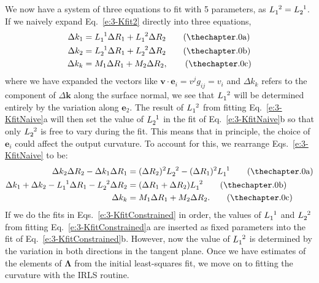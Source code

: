 We now have a system of three equations to fit with 5 parameters, as $\tensor{L}{_1^2} = \tensor{L}{_2^1}$.
If we naively expand Eq.~\ref{e:3-Kfit2} directly into three equations,
\label{e:3-KfitNaive}
\begin{align}
  \Delta k_1 &= \tensor{L}{_1^1} \Delta R_1 + \tensor{L}{_1^2} \Delta R_2\tag{\theequation a} \\
  \Delta k_2 &= \tensor{L}{_2^1} \Delta R_1 + \tensor{L}{_2^2} \Delta R_2\tag{\theequation b} \\
  \Delta k_k &= M_1 \Delta R_1 + M_2 \Delta R_2,\tag{\theequation c}
\end{align}
where we have expanded the vectors like $\mathbf{v}\cdot \mathbf{e}_i = v^j g_{ij} = v_i$ and $\Delta k_k$ refers to the component of $\Delta \mathbf{k}$ along the surface normal, we see that $\tensor{L}{_1^2}$ will be determined entirely by the variation along $\mathbf{e}_2$.
The result of $\tensor{L}{_1^2}$ from fitting Eq.~\ref{e:3-KfitNaive}a will then set the value of $\tensor{L}{_2^1}$ in the fit of Eq.~\ref{e:3-KfitNaive}b so that only $\tensor{L}{_2^2}$ is free to vary during the fit.
This means that in principle, the choice of $\mathbf{e}_i$ could affect the output curvature.
To account for this, we rearrange Eqs.~\ref{e:3-KfitNaive} to be:
\label{e:3-KfitConstrained}
\begin{align}
  \Delta k_2 \Delta R_2 - \Delta k_1 \Delta R_1 &= (\Delta R_2)^2 \tensor{L}{_2^2} - (\Delta R_1)^2 \tensor{L}{_1^1}\tag{\theequation a}\\
  \Delta k_1 + \Delta k_2 - \tensor{L}{_1^1} \Delta R_1 - \tensor{L}{_2^2} \Delta R_2 &= (\Delta R_1 + \Delta R_2)\tensor{L}{_1^2}\tag{\theequation b}\\
  \Delta k_k &= M_1 \Delta R_1 + M_2 \Delta R_2.\tag{\theequation c}
\end{align}
If we do the fits in Eqs.~\ref{e:3-KfitConstrained} in order, the values of $\tensor{L}{_1^1}$ and $\tensor{L}{_2^2}$ from fitting Eq.~\ref{e:3-KfitConstrained}a are inserted as fixed parameters into the fit of Eq.~\ref{e:3-KfitConstrained}b.
However, now the value of $\tensor{L}{_1^2}$ is determined by the variation in both directions in the tangent plane.
Once we have estimates of the elements of $\bm{\Lambda}$ from the initial least-squares fit, we move on to fitting the curvature with the IRLS routine.

